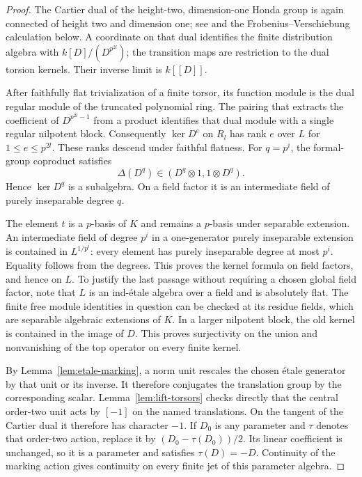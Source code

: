 \begin{proof}
The Cartier dual of the height-two, dimension-one Honda group is
again connected of height two and dimension one; see
\cite[Section~2.2, Proposition~1, and Section~2.3, Proposition~3]{Tate67}
and the Frobenius--Verschiebung calculation below. A coordinate on
that dual identifies the finite distribution algebra with
$k[D]/(D^{p^{2l}})$; the transition maps are restriction to the dual
torsion kernels.  Their inverse limit is $k[[D]]$.

After faithfully flat trivialization of a finite torsor, its function
module is the dual regular module of the truncated polynomial ring.
The pairing that extracts the coefficient of $D^{p^{2l}-1}$ from a
product identifies that dual module with a single regular nilpotent
block.  Consequently $\ker D^e$ on $R_l$ has rank $e$ over $L$ for
$1\le e\le p^{2l}$.  These ranks descend under faithful flatness.
For $q=p^i$, the formal-group coproduct satisfies
\[
 \Delta(D^q)\in(D^q\otimes1,1\otimes D^q).
\]
Hence $\ker D^q$ is a subalgebra.  On a field factor it is an
intermediate field of purely inseparable degree $q$.

The element $t$ is a $p$-basis of $K$ and remains a $p$-basis under
separable extension.  An intermediate field of degree $p^i$ in a
one-generator purely inseparable extension is contained in
$L^{1/p^i}$: every element has purely inseparable degree at most
$p^i$.  Equality follows from the degrees.  This proves the kernel
formula on field factors, and hence on $L$.  To justify the last
passage without requiring a chosen global field factor, note that
$L$ is an ind-\'{e}tale algebra over a field and is absolutely flat.
The finite free module identities in question can be checked at its
residue fields, which are separable algebraic extensions of $K$.
In a larger nilpotent block, the old kernel is contained in the image
of $D$.  This proves surjectivity on the union and nonvanishing of
the top operator on every finite kernel.

By Lemma~\ref{lem:etale-marking}, a norm unit rescales the chosen
\'{e}tale generator by that unit or its inverse.  It therefore
conjugates the translation group by the corresponding scalar.
Lemma~\ref{lem:lift-torsors} checks directly that the central
order-two unit acts by $[-1]$ on the named translations.  On the
tangent of the Cartier dual it therefore has character $-1$.
If $D_0$ is any parameter and $\tau$ denotes that order-two
action, replace it by $(D_0-\tau(D_0))/2$.  Its linear coefficient is
unchanged, so it is a parameter and satisfies $\tau(D)=-D$.
Continuity of the marking action gives continuity on every finite jet
of this parameter algebra.


\end{proof}
